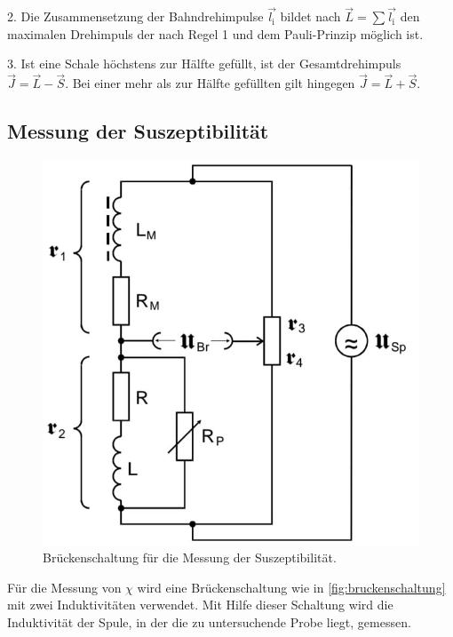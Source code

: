 2. Die Zusammensetzung der Bahndrehimpulse $\vec{l_\text{i}}$ bildet nach $\vec{L} = \sum \vec{l_\text{i}}$ den maximalen Drehimpuls der nach Regel 1 und dem Pauli-Prinzip möglich ist.

3. Ist eine Schale höchstens zur Hälfte gefüllt, ist der Gesamtdrehimpuls $\vec{J} = \vec{L} - \vec{S}$. Bei einer mehr als zur Hälfte gefüllten gilt hingegen
$\vec{J} = \vec{L} + \vec{S}$.

\subsection{Messung der Suszeptibilität}
\begin{figure}[H]
	\centering
	\includegraphics[width=0.7\linewidth]{data/brueckenschaltung.jpeg}
	\caption{Brückenschaltung für die Messung der Suszeptibilität.}
	\label{fig:bruckenschaltung}
\end{figure}
Für die Messung von $\chi$ wird eine Brückenschaltung wie in \autoref{fig:bruckenschaltung} mit zwei Induktivitäten verwendet. Mit Hilfe dieser Schaltung wird die
Induktivität der Spule, in der die zu untersuchende Probe liegt, gemessen.

